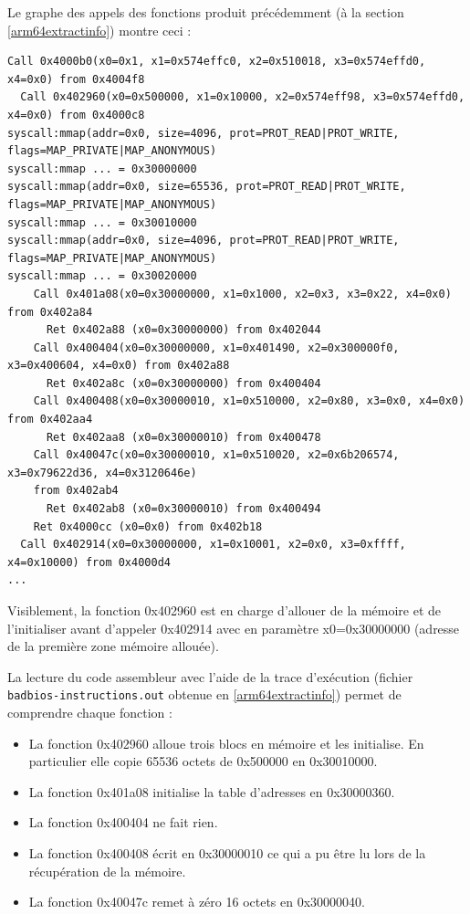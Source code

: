 \documentclass[a4paper,10pt]{article}
\begin{document}
Le graphe des appels des fonctions produit précédemment (à la section \ref{arm64extractinfo}) montre ceci :
\begin{verbatim}
Call 0x4000b0(x0=0x1, x1=0x574effc0, x2=0x510018, x3=0x574effd0, x4=0x0) from 0x4004f8
  Call 0x402960(x0=0x500000, x1=0x10000, x2=0x574eff98, x3=0x574effd0, x4=0x0) from 0x4000c8
syscall:mmap(addr=0x0, size=4096, prot=PROT_READ|PROT_WRITE, flags=MAP_PRIVATE|MAP_ANONYMOUS)
syscall:mmap ... = 0x30000000
syscall:mmap(addr=0x0, size=65536, prot=PROT_READ|PROT_WRITE, flags=MAP_PRIVATE|MAP_ANONYMOUS)
syscall:mmap ... = 0x30010000
syscall:mmap(addr=0x0, size=4096, prot=PROT_READ|PROT_WRITE, flags=MAP_PRIVATE|MAP_ANONYMOUS)
syscall:mmap ... = 0x30020000
    Call 0x401a08(x0=0x30000000, x1=0x1000, x2=0x3, x3=0x22, x4=0x0) from 0x402a84
      Ret 0x402a88 (x0=0x30000000) from 0x402044
    Call 0x400404(x0=0x30000000, x1=0x401490, x2=0x300000f0, x3=0x400604, x4=0x0) from 0x402a88
      Ret 0x402a8c (x0=0x30000000) from 0x400404
    Call 0x400408(x0=0x30000010, x1=0x510000, x2=0x80, x3=0x0, x4=0x0) from 0x402aa4
      Ret 0x402aa8 (x0=0x30000010) from 0x400478
    Call 0x40047c(x0=0x30000010, x1=0x510020, x2=0x6b206574, x3=0x79622d36, x4=0x3120646e)
    from 0x402ab4
      Ret 0x402ab8 (x0=0x30000010) from 0x400494
    Ret 0x4000cc (x0=0x0) from 0x402b18
  Call 0x402914(x0=0x30000000, x1=0x10001, x2=0x0, x3=0xffff, x4=0x10000) from 0x4000d4
...
\end{verbatim}

Visiblement, la fonction 0x402960 est en charge d'allouer de la mémoire et de l'initialiser avant d'appeler 0x402914 avec en paramètre x0=0x30000000 (adresse de la première zone mémoire allouée).

La lecture du code assembleur avec l'aide de la trace d'exécution (fichier \texttt{badbios-instructions.out} obtenue en \ref{arm64extractinfo}) permet de comprendre chaque fonction :
\begin{itemize}
\item La fonction 0x402960 alloue trois blocs en mémoire et les initialise. En particulier elle copie 65536 octets de 0x500000 en 0x30010000.
\item La fonction 0x401a08 initialise la table d'adresses en 0x30000360.
\item La fonction 0x400404 ne fait rien.
\item La fonction 0x400408 écrit en 0x30000010 ce qui a pu être lu lors de la récupération de la mémoire.
\item La fonction 0x40047c remet à zéro 16 octets en 0x30000040.
\end{itemize}
\end{document}

